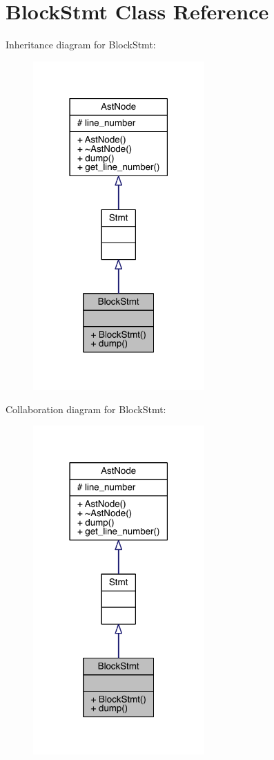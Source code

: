 \hypertarget{class_block_stmt}{}\section{Block\+Stmt Class Reference}
\label{class_block_stmt}


Inheritance diagram for Block\+Stmt\+:\nopagebreak
\begin{figure}[H]
\begin{center}
\leavevmode
\includegraphics[width=186pt]{class_block_stmt__inherit__graph}
\end{center}
\end{figure}


Collaboration diagram for Block\+Stmt\+:\nopagebreak
\begin{figure}[H]
\begin{center}
\leavevmode
\includegraphics[width=186pt]{class_block_stmt__coll__graph}
\end{center}
\end{figure}
